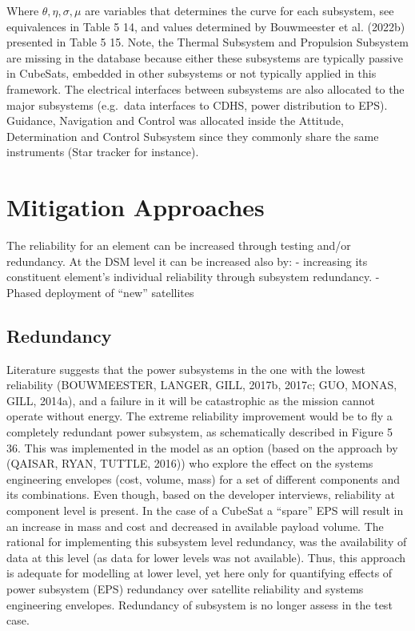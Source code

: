 Where \(\theta,\eta, \sigma, \mu\) are variables that determines the curve for each subsystem, see equivalences in Table 5 14, and values determined by Bouwmeester et al. (2022b) presented in Table 5 15. Note, the Thermal Subsystem and Propulsion Subsystem are missing in the database because either these subsystems are typically passive in CubeSats, embedded in other subsystems or not typically applied in this framework. The electrical interfaces between subsystems are also allocated to the major subsystems (e.g.\ data interfaces to CDHS, power distribution to EPS). Guidance, Navigation and Control was allocated inside the Attitude, Determination and Control Subsystem since they commonly share the same instruments (Star tracker for instance).


\section{Mitigation Approaches}

The reliability for an element can be increased through testing and/or redundancy. At the DSM level it can be increased also by:
- increasing its constituent element’s individual reliability through subsystem redundancy.
- Phased deployment of “new” satellites

\subsection{Redundancy}

Literature suggests that the power subsystems in the one with the lowest reliability (BOUWMEESTER, LANGER, GILL, 2017b, 2017c; GUO, MONAS, GILL, 2014a), and a failure in it will be catastrophic as the mission cannot operate without energy. The extreme reliability improvement would be to fly a completely redundant power subsystem, as schematically described in Figure 5 36. This was implemented in the model as an option (based on the approach by (QAISAR, RYAN, TUTTLE, 2016)) who explore the effect on the systems engineering envelopes (cost, volume, mass) for a set of different components and its combinations. 
Even though, based on the developer interviews, reliability at component level is present. In the case of a CubeSat a “spare” EPS will result in an increase in mass and cost and decreased in available payload volume. The rational for implementing this subsystem level redundancy, was the availability of data at this level (as data for lower levels was not available). Thus, this approach is adequate for modelling at lower level, yet here only for quantifying effects of power subsystem (EPS) redundancy over satellite reliability and systems engineering envelopes. Redundancy of subsystem is no longer assess in the test case.

